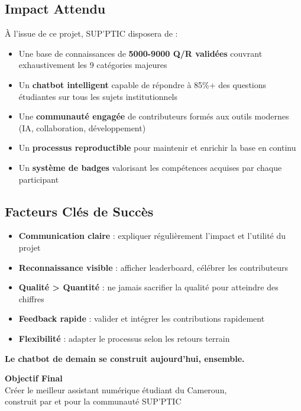 \documentclass[11pt,a4paper]{article}
\begin{document}
\subsection*{Impact Attendu}

À l'issue de ce projet, SUP'PTIC disposera de :
\begin{itemize}
    \item Une base de connaissances de \textbf{5000-9000 Q/R validées} couvrant exhaustivement les 9 catégories majeures
    \item Un \textbf{chatbot intelligent} capable de répondre à 85\%+ des questions étudiantes sur tous les sujets institutionnels
    \item Une \textbf{communauté engagée} de contributeurs formés aux outils modernes (IA, collaboration, développement)
    \item Un \textbf{processus reproductible} pour maintenir et enrichir la base en continu
    \item Un \textbf{système de badges} valorisant les compétences acquises par chaque participant
\end{itemize}

\vspace{1cm}

\subsection*{Facteurs Clés de Succès}

\begin{important}
\begin{itemize}
    \item \textbf{Communication claire} : expliquer régulièrement l'impact et l'utilité du projet
    \item \textbf{Reconnaissance visible} : afficher leaderboard, célébrer les contributeurs
    \item \textbf{Qualité > Quantité} : ne jamais sacrifier la qualité pour atteindre des chiffres
    \item \textbf{Feedback rapide} : valider et intégrer les contributions rapidement
    \item \textbf{Flexibilité} : adapter le processus selon les retours terrain
\end{itemize}
\end{important}

\newpage

\begin{center}
     \textbf{Le chatbot de demain se construit aujourd'hui, ensemble.} \\[0.5cm]
    
    \begin{tcolorbox}[colback=green!5!white, colframe=green!75!black, width=0.8\textwidth]
        \centering
        \textbf{Objectif Final} \\[0.3cm]
        \large Créer le meilleur assistant numérique étudiant du Cameroun, \\
        construit par et pour la communauté SUP'PTIC
    \end{tcolorbox}
\end{center}
\end{document}
